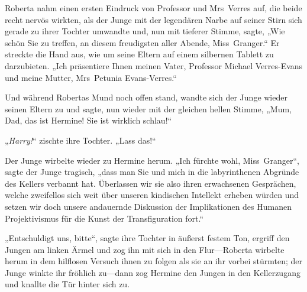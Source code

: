 Roberta nahm einen ersten Eindruck von Professor und Mrs~Verres auf, die beide recht nervös wirkten, als der Junge mit der legendären Narbe auf seiner Stirn sich gerade zu ihrer Tochter umwandte und, nun mit tieferer Stimme, sagte, „Wie schön Sie zu treffen, an diesem freudigsten aller Abende, Miss~Granger.“ Er streckte die Hand aus, wie um seine Eltern auf einem silbernen Tablett zu darzubieten. „Ich präsentiere Ihnen meinen Vater, Professor Michael Verres-Evans und meine Mutter, Mrs~Petunia Evans-Verres.“

Und während Robertas Mund noch offen stand, wandte sich der Junge wieder seinen Eltern zu und sagte, nun wieder mit der gleichen hellen Stimme, „Mum, Dad, das ist Hermine! Sie ist wirklich schlau!“

„\emph{Harry!}“ zischte ihre Tochter. „Lass das!“

Der Junge wirbelte wieder zu Hermine herum. „Ich fürchte wohl, Miss~Granger“, sagte der Junge tragisch, „dass man Sie und mich in die labyrinthenen Abgründe des Kellers verbannt hat. Überlassen wir sie also ihren erwachsenen Gesprächen, welche zweifellos sich weit über unseren kindischen Intellekt erheben würden und setzen wir doch unsere andauernde Diskussion der Implikationen des Humanen Projektivismus für die Kunst der Transfiguration fort.“

„Entschuldigt uns, bitte“, sagte ihre Tochter in äußerst festem Ton, ergriff den Jungen am linken Ärmel und zog ihn mit sich in den Flur—Roberta wirbelte herum in dem hilflosen Versuch ihnen zu folgen als sie an ihr vorbei stürmten; der Junge winkte ihr fröhlich zu—dann zog Hermine den Jungen in den Kellerzugang und knallte die Tür hinter sich zu.

